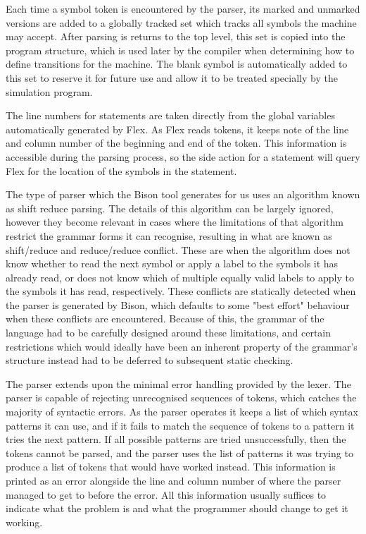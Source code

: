 \documentclass[11pt]{article}
\begin{document}
Each time a symbol token is encountered by the parser, its marked and unmarked versions are added to a globally tracked set which tracks all symbols the machine may accept. After parsing is returns to the top level, this set is copied into the program structure, which is used later by the compiler when determining how to define transitions for the machine. The blank symbol is automatically added to this set to reserve it for future use and allow it to be treated specially by the simulation program.

The line numbers for statements are taken directly from the global variables automatically generated by Flex. As Flex reads tokens, it keeps note of the line and column number of the beginning and end of the token. This information is accessible during the parsing process, so the side action for a statement will query Flex for the location of the symbols in the statement.

The type of parser which the Bison tool generates for us uses an algorithm known as shift reduce parsing. The details of this algorithm can be largely ignored, however they become relevant in cases where the limitations of that algorithm restrict the grammar forms it can recognise, resulting in what are known as shift/reduce and reduce/reduce conflict. These are when the algorithm does not know whether to read the next symbol or apply a label to the symbols it has already read, or does not know which of multiple equally valid labels to apply to the symbols it has read, respectively. These conflicts are statically detected when the parser is generated by Bison, which defaults to some "best effort" behaviour when these conflicts are encountered. Because of this, the grammar of the language had to be carefully designed around these limitations, and certain restrictions which would ideally have been an inherent property of the grammar's structure instead had to be deferred to subsequent static checking.

The parser extends upon the minimal error handling provided by the lexer. The parser is capable of rejecting unrecognised sequences of tokens, which catches the majority of syntactic errors. As the parser operates it keeps a list of which syntax patterns it can use, and if it fails to match the sequence of tokens to a pattern it tries the next pattern. If all possible patterns are tried unsuccessfully, then the tokens cannot be parsed, and the parser uses the list of patterns it was trying to produce a list of tokens that would have worked instead. This information is printed as an error alongside the line and column number of where the parser managed to get to before the error. All this information usually suffices to indicate what the problem is and what the programmer should change to get it working.
\end{document}
